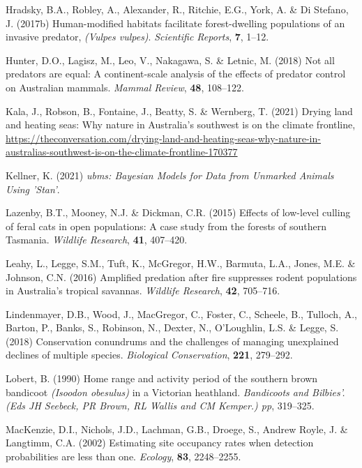 \documentclass[]{elsarticle} %
\begin{document}
\leavevmode\hypertarget{ref-hradsky2017human}{}%
Hradsky, B.A., Robley, A., Alexander, R., Ritchie, E.G., York, A. \& Di Stefano, J. (2017b) Human-modified habitats facilitate forest-dwelling populations of an invasive predator, \emph{(Vulpes vulpes)}. \emph{Scientific Reports}, \textbf{7}, 1--12.

\leavevmode\hypertarget{ref-hunter2018not}{}%
Hunter, D.O., Lagisz, M., Leo, V., Nakagawa, S. \& Letnic, M. (2018) Not all predators are equal: A continent-scale analysis of the effects of predator control on Australian mammals. \emph{Mammal Review}, \textbf{48}, 108--122.

\leavevmode\hypertarget{ref-drying2021kala}{}%
Kala, J., Robson, B., Fontaine, J., Beatty, S. \& Wernberg, T. (2021) Drying land and heating seas: Why nature in Australia's southwest is on the climate frontline, \url{https://theconversation.com/drying-land-and-heating-seas-why-nature-in-australias-southwest-is-on-the-climate-frontline-170377}

\leavevmode\hypertarget{ref-ubms}{}%
Kellner, K. (2021) \emph{ubms: Bayesian Models for Data from Unmarked Animals Using 'Stan'}.

\leavevmode\hypertarget{ref-lazenby2015effects}{}%
Lazenby, B.T., Mooney, N.J. \& Dickman, C.R. (2015) Effects of low-level culling of feral cats in open populations: A case study from the forests of southern Tasmania. \emph{Wildlife Research}, \textbf{41}, 407--420.

\leavevmode\hypertarget{ref-leahy2016amplified}{}%
Leahy, L., Legge, S.M., Tuft, K., McGregor, H.W., Barmuta, L.A., Jones, M.E. \& Johnson, C.N. (2016) Amplified predation after fire suppresses rodent populations in Australia's tropical savannas. \emph{Wildlife Research}, \textbf{42}, 705--716.

\leavevmode\hypertarget{ref-lindenmayer2018conservation}{}%
Lindenmayer, D.B., Wood, J., MacGregor, C., Foster, C., Scheele, B., Tulloch, A., Barton, P., Banks, S., Robinson, N., Dexter, N., O'Loughlin, L.S. \& Legge, S. (2018) Conservation conundrums and the challenges of managing unexplained declines of multiple species. \emph{Biological Conservation}, \textbf{221}, 279--292.

\leavevmode\hypertarget{ref-lobert1990home}{}%
Lobert, B. (1990) Home range and activity period of the southern brown bandicoot \emph{(Isoodon obesulus)} in a Victorian heathland. \emph{Bandicoots and Bilbies'.(Eds JH Seebeck, PR Brown, RL Wallis and CM Kemper.) pp}, 319--325.

\leavevmode\hypertarget{ref-mackenzie2002estimating}{}%
MacKenzie, D.I., Nichols, J.D., Lachman, G.B., Droege, S., Andrew Royle, J. \& Langtimm, C.A. (2002) Estimating site occupancy rates when detection probabilities are less than one. \emph{Ecology}, \textbf{83}, 2248--2255.
\end{document}
